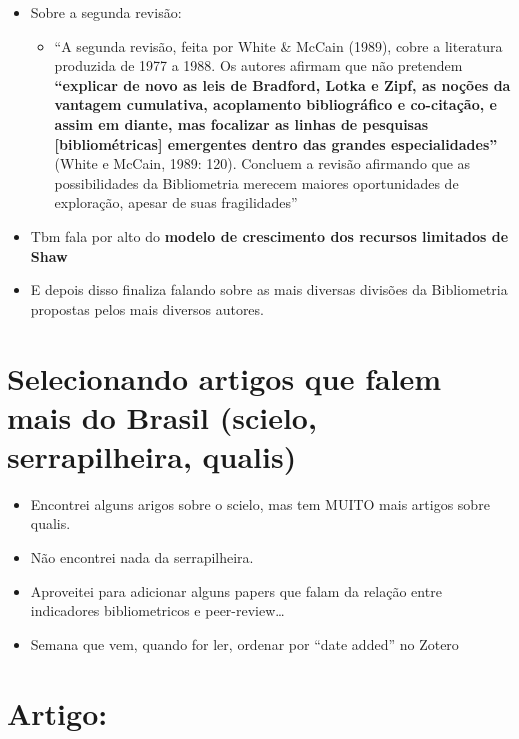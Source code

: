 \documentclass[11pt]{article}
\begin{document}
\begin{itemize}
\begin{itemize}
\end{itemize}
\item Sobre a segunda revisão:
\begin{itemize}
\item ``A segunda revisão, feita por White \& McCain (1989), cobre a literatura produzida de 1977 a 1988. Os autores afirmam que não pretendem \textbf{“explicar de novo as leis de Bradford, Lotka e Zipf, as noções da vantagem cumulativa, acoplamento bibliográfico e co-citação, e assim em diante, mas focalizar as linhas de pesquisas [bibliométricas] emergentes dentro das grandes especialidades”} (White e McCain, 1989: 120). Concluem a revisão afirmando que as possibilidades da Bibliometria merecem maiores oportunidades de exploração, apesar de suas fragilidades''
\end{itemize}
\item Tbm fala por alto do \textbf{modelo de crescimento dos recursos limitados de Shaw}

\item E depois disso finaliza falando sobre as mais diversas divisões da Bibliometria propostas pelos mais diversos autores.
\end{itemize}

\section{Selecionando artigos que falem mais do Brasil (scielo, serrapilheira, qualis)}
\label{sec:org7330c65}
\begin{itemize}
\item Encontrei alguns arigos sobre o scielo, mas tem MUITO mais artigos sobre qualis.
\item Não encontrei nada da serrapilheira.
\item Aproveitei para adicionar alguns papers que falam da relação entre indicadores bibliometricos e peer-review\ldots{}
\item Semana que vem, quando for ler, ordenar por ``date added'' no Zotero
\end{itemize}

\section{Artigo: \cite{rego2014}}
\label{sec:orgdc17e99}
\end{document}
